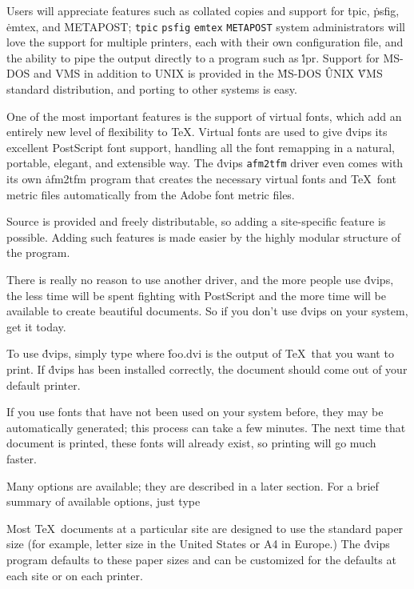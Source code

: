 Users will appreciate features such as collated copies and support
for \.{tpic}, \.{psfig}, \.{emtex}, and \.{METAPOST};
\^{{\tt tpic}}
\^{{\tt psfig}}
\^{{\tt emtex}}
\^{{\tt METAPOST}}
system administrators will love the support for multiple printers, each
with their own configuration file, and the ability to pipe the output
directly to a program such as \.{lpr}.
Support for MS-DOS and VMS in addition to UNIX is provided in the
\^{MS-DOS}
\^{UNIX}
\^{VMS}
standard distribution, and porting to other systems is easy.

One of the most important features is the support of virtual fonts, which
add an entirely new level of flexibility to \TeX.  Virtual fonts are used to
give \.{dvips} its excellent PostScript font support, handling all the font
remapping in a natural, portable, elegant, and extensible way.  The \.{dvips}
\^{{\tt afm2tfm}}
driver even comes with its own \.{afm2tfm} program that creates the necessary
virtual fonts and \TeX\ font metric files automatically from the Adobe
font metric files.

Source is provided and freely distributable, so adding a site-specific feature
is possible.  Adding such features is made easier by the highly modular
structure of the program.

There is really no reason to use another driver, and the more people use
\.{dvips}, the less time will be spent fighting with PostScript and the
more time will be available to create beautiful documents.
So if you don't use \.{dvips} on your system, get it today.


To use \.{dvips}, simply type
\noindent
where \.{foo.dvi} is the output of \TeX\ that you want to print.  If \.{dvips}
has been installed correctly, the document should come out of your default
printer.

If you use fonts that have not been used on your system before, they
may be automatically generated; this process can take a few minutes.
The next time that document is printed, these fonts will already exist, so
printing will go much faster.

Many options are available; they are described in a later section.
For a brief summary of available options, just type


Most \TeX\ documents at a particular site are designed to use the
standard paper size (for example, letter size in the United States
or A4 in Europe.)  The \.{dvips} program defaults to these paper
sizes and can be customized for the defaults at each site or on
each printer.

